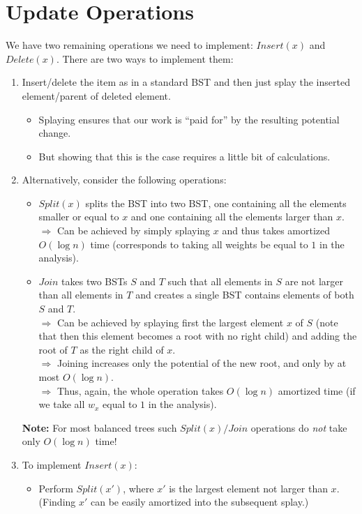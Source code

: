 \documentclass{article}
\begin{document}
\section{Update Operations}

We have two remaining operations we need to implement: $Insert(x)$ and $Delete(x)$. There are two ways to implement them:

\begin{enumerate}
\item Insert/delete the item as in a standard BST and then just splay the inserted element/parent of deleted element.
\begin{itemize}
\item Splaying ensures that our work is ``paid for'' by the resulting potential change.
\item But showing that this is the case requires a little bit of calculations. 
\end{itemize}
\item Alternatively, consider the following operations:
\begin{itemize}
\item $Split(x)$ splits the BST into two BST, one containing all the elements smaller or equal to $x$ and one containing all the elements larger than $x$. \\
$\Rightarrow$ Can be achieved by simply splaying $x$ and thus takes amortized $O(\log n)$ time (corresponds to taking all weights be equal to $1$ in the analysis). 
\item $Join$ takes two BSTs $S$ and $T$ such that all elements in $S$ are not larger than all elements in $T$ and creates a single BST contains elements of both $S$ and $T$.\\
$\Rightarrow$ Can be achieved by splaying first the largest element $x$ of $S$ (note that then this element becomes a root with no right child) and adding the root of $T$ as the right child of $x$.\\
$\Rightarrow$ Joining increases only the potential of the new root, and only by at most $O(\log n)$.\\
$\Rightarrow$ Thus, again, the whole operation takes $O(\log n)$ amortized time (if we take all $w_x$ equal to $1$ in the analysis). 
\end{itemize}
{\bf Note:} For most balanced trees such $Split(x)/Join$ operations do {\em not} take only $O(\log n)$ time!
\item To implement $Insert(x)$:
\begin{itemize}
\item Perform $Split(x')$, where $x'$ is the largest element not larger than $x$. (Finding $x'$ can be easily amortized into the subsequent splay.)

\end{itemize}
\end{enumerate}
\end{document}
